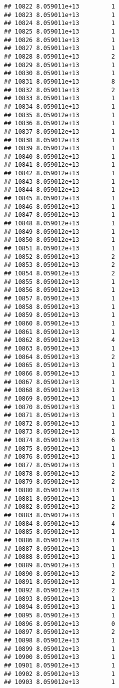 \documentclass[
]{article}
\begin{document}
\begin{verbatim}
## 10822 8.059011e+13         1
## 10823 8.059011e+13         1
## 10824 8.059011e+13         1
## 10825 8.059011e+13         1
## 10826 8.059011e+13         1
## 10827 8.059011e+13         1
## 10828 8.059011e+13         2
## 10829 8.059011e+13         1
## 10830 8.059011e+13         1
## 10831 8.059011e+13         8
## 10832 8.059011e+13         2
## 10833 8.059011e+13         1
## 10834 8.059011e+13         1
## 10835 8.059012e+13         1
## 10836 8.059012e+13         1
## 10837 8.059012e+13         1
## 10838 8.059012e+13         1
## 10839 8.059012e+13         1
## 10840 8.059012e+13         1
## 10841 8.059012e+13         1
## 10842 8.059012e+13         1
## 10843 8.059012e+13         1
## 10844 8.059012e+13         1
## 10845 8.059012e+13         1
## 10846 8.059012e+13         1
## 10847 8.059012e+13         1
## 10848 8.059012e+13         1
## 10849 8.059012e+13         1
## 10850 8.059012e+13         1
## 10851 8.059012e+13         1
## 10852 8.059012e+13         2
## 10853 8.059012e+13         2
## 10854 8.059012e+13         2
## 10855 8.059012e+13         1
## 10856 8.059012e+13         1
## 10857 8.059012e+13         1
## 10858 8.059012e+13         1
## 10859 8.059012e+13         1
## 10860 8.059012e+13         1
## 10861 8.059012e+13         1
## 10862 8.059012e+13         4
## 10863 8.059012e+13         1
## 10864 8.059012e+13         2
## 10865 8.059012e+13         1
## 10866 8.059012e+13         1
## 10867 8.059012e+13         1
## 10868 8.059012e+13         1
## 10869 8.059012e+13         1
## 10870 8.059012e+13         1
## 10871 8.059012e+13         1
## 10872 8.059012e+13         1
## 10873 8.059012e+13         1
## 10874 8.059012e+13         6
## 10875 8.059012e+13         1
## 10876 8.059012e+13         1
## 10877 8.059012e+13         1
## 10878 8.059012e+13         2
## 10879 8.059012e+13         2
## 10880 8.059012e+13         1
## 10881 8.059012e+13         1
## 10882 8.059012e+13         2
## 10883 8.059012e+13         1
## 10884 8.059012e+13         4
## 10885 8.059012e+13         1
## 10886 8.059012e+13         1
## 10887 8.059012e+13         1
## 10888 8.059012e+13         1
## 10889 8.059012e+13         1
## 10890 8.059012e+13         2
## 10891 8.059012e+13         1
## 10892 8.059012e+13         2
## 10893 8.059012e+13         1
## 10894 8.059012e+13         1
## 10895 8.059012e+13         1
## 10896 8.059012e+13         0
## 10897 8.059012e+13         2
## 10898 8.059012e+13         1
## 10899 8.059012e+13         1
## 10900 8.059012e+13         1
## 10901 8.059012e+13         1
## 10902 8.059012e+13         1
## 10903 8.059012e+13         1

\end{verbatim}
\end{document}
